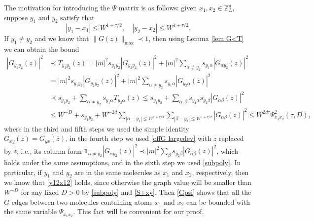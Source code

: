 \documentclass{article}
\newcommand{\1}{\mathds{1}}
\numberwithin{equation}{section}
\newcommand{\al}{\alpha}
\newcommand{\be}{\begin{equation}}
\newcommand{\ee}{\end{equation}}
\newcommand{\e}{{\varepsilon}}
\renewcommand{\cal}{\mathcal}
\newcommand{\wt}{\widetilde}
\renewcommand{\leq}{\leqslant}
\renewcommand{\geq}{\geqslant}
\renewcommand{\le}{\leq}
\renewcommand{\ge}{\geq}
\newcommand{\Z}{\mathbb{Z}}
\theoremstyle{plain} %
\newtheorem{lemma}[theorem]{Lemma}
\theoremstyle{remark}
\begin{document}
The motivation for introducing the $\Psi$ matrix is as follows: given $x_1,x_2\in \Z_L^d$, suppose $y_1$ and $y_2$ satisfy that  
\be\label{y12x12}|y_1-x_1|\le W^{1+\tau/2} ,\quad |y_2-x_2|\le W^{1+\tau/2}.\ee 
If $y_1\ne y_2$ and we know that $\|G(z)\|_{\max}\prec 1$, then using Lemma \ref{lem G<T} we can obtain the bound 
\begin{align}
|G_{y_1y_2}(z)|^2&\prec T_{y_1y_2}(z) =|m|^2 s_{y_1y_2}|G_{y_2y_2}(z)|^2 +|m|^2 \sum_{\al\ne y_2}s_{y_1 \al}|G_{\al y_2}(z)|^2 \nonumber\\
&=|m|^2 s_{y_1y_2}|G_{y_2y_2}(z)|^2 +|m|^2 \sum_{\al\ne y_2}s_{y_1 \al}|G_{y_2\al }(\overline z)|^2 \nonumber\\
&\prec   s_{y_1y_2} +  \sum_{\al\ne y_2}s_{y_1\al} T_{ y_2 \al}(\overline z)  \le s_{y_1y_2} + \sum_{\al ,\beta} s_{y_1\al}s_{y_2\beta} |G_{\al\beta }(z)|^2 \nonumber\\
&\le W^{-D}+s_{y_1y_2} + W^{-2d}\sum_{|\al-y_1|\le W^{1+\tau/2}}\sum_{|\beta-y_2|\le W^{1+\tau/2}}  |G_{\al\beta}(z)|^2  \le W^{2d\tau} \Psi_{x_1x_2}^2(\tau,D),\label{Gpsi}
\end{align}
where in the third and fifth steps we used the simple identity $G_{xy}(z)=\overline{G_{yx}(\overline z)}$, in the fourth step we used \eqref{offG largedev} with $z$ replaced by $\overline z$, i.e., its column form $\mathbf 1_{\al\ne y_2}|G_{\al y_2}(z)|^2\prec |m|^2\sum_{\beta}s_{y_2\beta}|G_{\al\beta}(z)|^2$, which holds under the same assumptions, and in the sixth step we used \eqref{subpoly}. In particular, if $y_1$ and $y_2$ are in the same molecules as $x_1$ and $x_2$, respectively, then we know that \eqref{y12x12} holds, since otherwise the graph value will be smaller than $W^{-D}$ for any fixed $D>0$ by \eqref{subpoly} and \eqref{S+xy}. Then \eqref{Gpsi} shows that all the $G$ edges between two molecules containing atoms $x_1$ and $x_2$ can be bounded with the same variable $\Psi_{x_1x_2}$. This fact will be convenient for our proof. %

%
 
\end{document}
